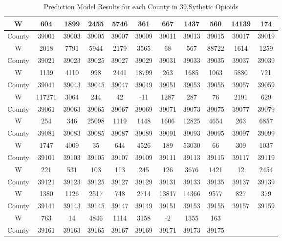 \documentclass[12pt]{mcmthesis}
\begin{document}
\begin{table}[htbp]
\centering
\caption{Prediction Model Results for each County in 39,Sythetic Opioids}\label{results112}
\begin{tabular}{|c|c|c|c|c|c|c|c|c|c|c|}
  \hline
W      & 604    & 1899  & 2455  & 5746  & 361   & 667   & 1437  & 560   & 14139 & 174   \\ \hline
County & 39001  & 39003 & 39005 & 39007 & 39009 & 39011 & 39013 & 39015 & 39017 & 39019 \\ \hline
W      & 2018   & 7791  & 5944  & 2179  & 3565  & 68    & 567   & 88722 & 1614  & 1259  \\ \hline
County & 39021  & 39023 & 39025 & 39027 & 39029 & 39031 & 39033 & 39035 & 39037 & 39039 \\ \hline
W      & 1139   & 4110  & 998   & 2441  & 18799 & 263   & 1685  & 1063  & 5880  & 721   \\ \hline
County & 39041  & 39043 & 39045 & 39047 & 39049 & 39051 & 39053 & 39055 & 39057 & 39059 \\ \hline
W      & 117271 & 3064  & 244   & 42    & -11   & 1287  & 287   & 76    & 2191  & 629   \\ \hline
County & 39061  & 39063 & 39065 & 39067 & 39069 & 39071 & 39073 & 39075 & 39077 & 39079 \\ \hline
W      & 254    & 346   & 25098 & 1119  & 1448  & 1606  & 12825 & 4654  & 263   & 6857  \\ \hline
County & 39081  & 39083 & 39085 & 39087 & 39089 & 39091 & 39093 & 39095 & 39097 & 39099 \\ \hline
W      & 1747   & 4009  & 35    & 644   & 4526  & 189   & 53030 & 66    & 309   & 1037  \\ \hline
County & 39101  & 39103 & 39105 & 39107 & 39109 & 39111 & 39113 & 39115 & 39117 & 39119 \\ \hline
W      & 221    & 531   & 103   & 113   & 245   & 126   & 3676  & 1421  & 12    & 2454  \\ \hline
County & 39121  & 39123 & 39125 & 39127 & 39129 & 39131 & 39133 & 39135 & 39137 & 39139 \\ \hline
W      & 1380   & 1126  & 2517  & 748   & 2714  & 13817 & 14366 & 9577  & 827   & 379   \\ \hline
County & 39141  & 39143 & 39145 & 39147 & 39149 & 39151 & 39153 & 39155 & 39157 & 39159 \\ \hline
W      & 763    & 14    & 4846  & 1114  & 3158  & -2    & 1355  & 163   &       &       \\ \hline
County & 39161  & 39163 & 39165 & 39167 & 39169 & 39171 & 39173 & 39175 &       &       \\ \hline
\end{tabular}
\end{table}
\end{document}
